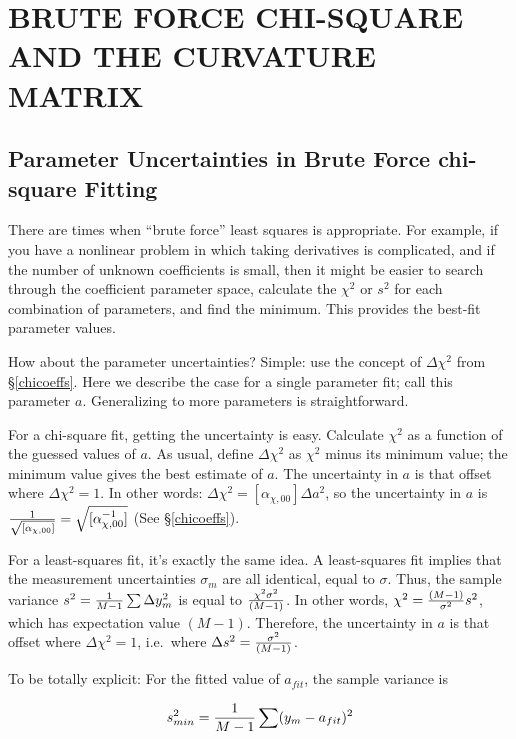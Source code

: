 \documentclass[psfig,preprint]{aastex}
\begin{document}
\section{BRUTE FORCE CHI-SQUARE AND THE CURVATURE MATRIX}

\subsection{Parameter Uncertainties in Brute Force chi-square Fitting}

	There are times when ``brute force'' least squares is
appropriate.  For example, if you have a nonlinear problem in which
taking derivatives is complicated, and if the number of unknown
coefficients is small, then it might be easier to search through the
coefficient parameter space, calculate the $\chi^2$ or $s^2$ for each
combination of parameters, and find the minimum. This provides the
best-fit parameter values. 

How about the parameter uncertainties? Simple: use the concept of
$\Delta \chi^2$ from \S \ref{chicoeffs}. Here we describe the case for a
single parameter fit; call this parameter $a$. Generalizing to more
parameters is straightforward.

	For a chi-square fit, getting the uncertainty is easy. Calculate
$\chi^2$ as a function of the guessed values of $a$. As usual, define
$\Delta \chi^2$ as $\chi^2$ minus its minimum value; the minimum value
gives the best estimate of $a$. The uncertainty in $a$ is that offset
where $\Delta \chi^2 = 1$. In other words: 
$\Delta \chi^2=
[\alpha_{\chi,00}] \Delta a^2$, so the uncertainty in $a$ is ${1 \over
\sqrt{[\alpha_{\chi,00}]} }
=\sqrt{[\alpha_{\chi,00}^{-1}]}$ (See \S \ref{chicoeffs}).

	For a least-squares fit, it's exactly the same idea. A
least-squares fit implies that the measurement uncertainties $\sigma_m$
are all identical, equal to $\sigma$. Thus, the sample variance $s^2 =
{1 \over M-1} \sum \Delta y_m^2$ is equal to $\chi^2 \sigma^2 \over
(M-1)$. In other words, $\chi^2 = {(M-1) \over \sigma^2} s^2$, which has
expectation value $(M-1)$. Therefore, the uncertainty in $a$ is that
offset where $\Delta \chi^2 = 1$, i.e.\ where $\Delta s^2 = {\sigma^2
\over (M-1)}$.

	To be totally explicit: 
For the fitted
value of $a_{fit}$, the sample variance is

\begin{equation}
s_{min}^2 = {1 \over M-1} \sum (y_m - a_{fit})^2
\end{equation}
\end{document}
